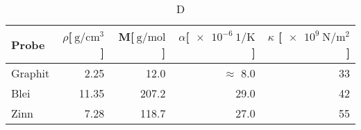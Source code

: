 
\begin{table}[!h]
\begin{center}
\begin{tabular}{|l|r|r|r|r|}
\hline
Probe & $\rho$[$\SI{}{\gram\per\centi\meter^3}$] & M[$\SI{}{\gram\per\mol}$] & $\alpha$[$\SI{e-6}{1\per\kelvin}$] & $\kappa$ [$\SI{e9}{\newton\per\meter^2}$]\\
\hline
\hline
Graphit	& 2.25  & 12.0  & $\approx$ 8.0  & 33\\
Blei	& 11.35 & 207.2 & 29.0 & 42\\
Zinn	& 7.28  & 118.7 & 27.0 & 55\\
\hline
\end{tabular}
\caption[]{D}
\label{massen}
\end{center}
\end{table}